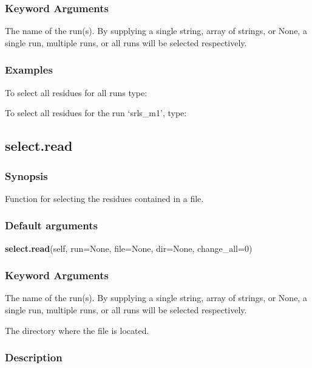 \subsubsection{Keyword Arguments}

  The name of the run(s).  By supplying a single string, array of strings, or None, a single run, multiple runs, or all runs will be selected respectively.

\subsubsection{Examples}

To select all residues for all runs type:


To select all residues for the run `srls\_m1', type:




\newpage

\subsection{select.read}


\subsubsection{Synopsis}

Function for selecting the residues contained in a file.

\subsubsection{Default arguments}

\textsf{\textbf{select.read}(self, run=None, file=None, dir=None, change\_all=0)}


\subsubsection{Keyword Arguments}

  The name of the run(s).  By supplying a single string, array of strings, or None, a single run, multiple runs, or all runs will be selected respectively.

  The directory where the file is located.


\subsubsection{Description}

